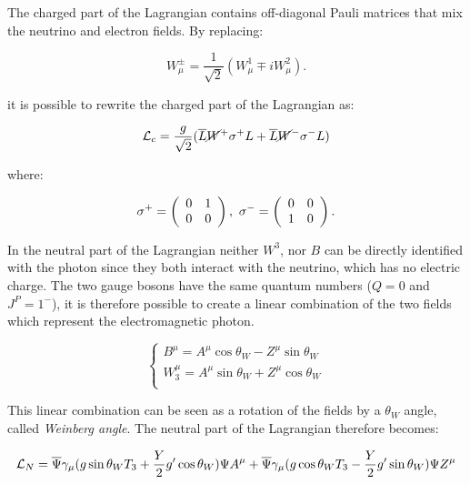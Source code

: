 The charged part of the Lagrangian contains off-diagonal Pauli matrices that mix the neutrino and electron fields. By replacing:

\begin{equation}
W^\pm_\mu = \frac{1}{\sqrt{2}}(W^{1}_{\mu} \mp i W^{2}_{\mu}).
\label{eq:wpm_def}
\end{equation}

it is possible to rewrite the charged part of the Lagrangian as:

\begin{equation}
\mathcal{L}_c = \frac{g}{\sqrt{2}}(\overline{L}\cancel{W}^{+} \sigma^{+} L +\overline{L}\cancel{W}^{-}\sigma^{-} L)
\end{equation}

where:

\begin{equation}
\sigma^+ = \left(\begin{array}{cc}0 & 1 \\0 & 0\end{array}\right),\,\, \sigma^- = \left(\begin{array}{cc}0 & 0 \\1 & 0\end{array}\right).
\end{equation}

In the neutral part of the Lagrangian neither $W^3$, nor $B$ can be directly identified with the photon since they both interact with the neutrino, which has no electric charge. The two gauge bosons have the same quantum numbers ($Q = 0$ and $J^P = 1^-$), it is therefore possible to create a linear combination of the two fields which represent the electromagnetic photon.

\begin{equation}
\left\{\begin{matrix}
B^{\mu}=A^{\mu}\operatorname{cos}\theta_{W}-Z^{\mu}\operatorname{sin}\theta_{W}\\ 

W^{\mu}_3=A^{\mu}\operatorname{sin}\theta_{W}+Z^{\mu}\cos\theta_{W}\\ 
\end{matrix}\right.
\label{eq:su2_rotation}
\end{equation}

This linear combination can be seen as a rotation of the fields by a $\theta_W$ angle, called \emph{Weinberg angle}. 
The neutral part of the Lagrangian therefore becomes:
 
\begin{equation}
\mathcal{L}_{N}=\overline{\Psi}\gamma_{\mu}(g\operatorname{sin}\theta_{W}T_3+ \frac{Y}{2}g'\operatorname{cos}\theta_{W})\Psi A^{\mu}+\overline{\Psi}\gamma_{\mu}(g\operatorname{cos}\theta_{W}T_3- \frac{Y}{2}g'\operatorname{sin}\theta_{W})\Psi Z^{\mu}
\end{equation}

